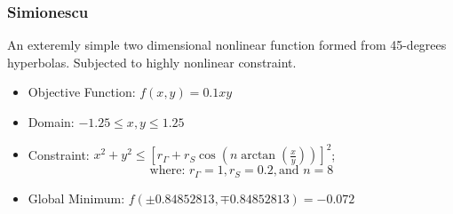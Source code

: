 \subsubsection{Simionescu}
An exteremly simple two dimensional nonlinear function formed from 45-degrees hyperbolas. Subjected to highly nonlinear constraint.
\begin{itemize}
	\item Objective Function: $f(x,y) = 0.1xy$
	\item Domain: $-1.25 \leq x,y \leq 1.25$
	\item Constraint: $x^2 + y^2 \leq \left[r_{\Gamma}+r_S\cos\left(n \arctan(\frac{x}{y})\right)\right]^2 $; \[ \text{where: } r_{\Gamma}=1, r_S = 0.2, \text{and } n=8 \]
	\item Global Minimum: $f(\pm 0.84852813,\mp0.84852813) = -0.072$
\end{itemize}
